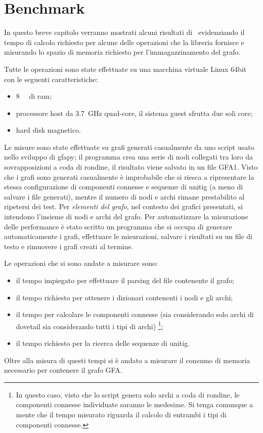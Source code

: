 \chapter{Benchmark}
In questo breve capitolo verranno mostrati
alcuni risultati di \pygfa \  evidenziando il tempo di calcolo
richiesto per alcune delle operazioni che la libreria fornisce e misurando
lo spazio di memoria richiesto per l'immagazzinamento del grafo.

Tutte le operazioni sono state effettuate su una macchina virtuale
Linux 64bit con le seguenti caratteristiche:
\begin{itemize}
	\item \SI{8}{\giga\byte} di ram;
	\item processore host da \SI{3.7}{\giga\hertz} quad-core, il
		sistema guest sfrutta due soli core;
	\item hard disk magnetico.
\end{itemize}

Le misure sono state effettuate su grafi generati casualmente
da uno script usato nello sviluppo di gfapy; il programma
crea una serie di nodi collegati tra loro da sovrapposizioni
a coda di rondine, il risultato viene salvato in un file GFA1.
Visto che i grafi sono generati casualmente è improbabile
che si riesca a ripresentare la stessa configurazione di componenti
connesse e sequenze di unitig (a meno di salvare i file generati),
mentre il numero di nodi e archi rimane prestabilito al ripetersi
dei test. Per \emph{elementi del grafo}, nel contesto dei grafici presentati,
si intendono l'insieme di nodi e archi del grafo.
Per automatizzare la misurazione delle performance è stato
scritto un programma che si occupa di generare automaticamente
i grafi, effettuare le misurazioni, salvare i risultati su un file di testo
e rimuovere i grafi creati al termine.

Le operazioni che si sono andate a misurare sono:
\begin{itemize}
	\item il tempo impiegato per effettuare il parsing del file contenente il grafo;
	\item il tempo richiesto per ottenere i dizionari contenenti i nodi e gli archi;
	\item il tempo per calcolare le componenti connesse (sia considerando
		solo archi di dovetail sia considerando tutti i tipi di archi)
		\footnote{In questo caso, visto che lo script genera solo archi a coda
		di rondine, le componenti connesse individuate saranno le medesime. Si tenga
		comunque a mente che il tempo misurato riguarda il calcolo di entrambi
		i tipi di componenti connesse.};
	\item il tempo richiesto per la ricerca delle sequenze di unitig.
\end{itemize}
Oltre alla misura di questi tempi si è andato a misurare il consumo
di memoria necessario per contenere il grafo GFA.
\clearpage

